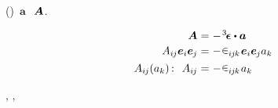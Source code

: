 ()~$\bm{a}$
~${\hspace{-0.2ex}\bm{A}}$.


\nopagebreak\vspace{-0.8em}
\begin{equation*}
\begin{array}{r@{\hspace{.7ex}}c@{\hspace{.7ex}}l}
\bm{A}
& = &
- \hspace{.2ex} \permutationsparitytensor \dotp \bm{a}
\\[.2em]
A_{i\hspace{-0.1ex}j} \bm{e}_i \bm{e}_{\hspace{-0.1ex}j}
& = &
- \hspace{.1ex} \permutationsparitysymbols{i\hspace{-0.1ex}j\hspace{-0.1ex}k} \hspace{.1ex} \bm{e}_i \bm{e}_{\hspace{-0.1ex}j} a_k
\\[.4em]
A_{i\hspace{-0.1ex}j} ( a_k ) \hspace{.4ex} \text{:} \hspace{.7em}
A_{i\hspace{-0.1ex}j}
& = &
- \hspace{.1ex} \permutationsparitysymbols{i\hspace{-0.1ex}j\hspace{-0.1ex}k} \hspace{.1ex} a_k
\end{array}
\end{equation*}

\vspace{-0.2em}\noindent
{},
,

